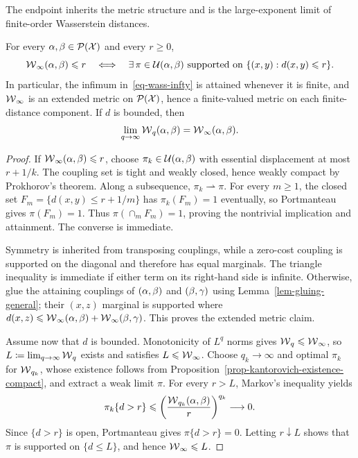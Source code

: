 The endpoint inherits the metric structure and is the large-exponent limit of finite-order Wasserstein distances.
\begin{prop}\label{prop-wasserstein-infinity-metric}
	For every $\alpha,\beta\in\mathcal{P}(\mathcal{X})$ and every $r\geq0$,
	\[
		\operatorname{\mathcal{W}}_\infty(\alpha,\beta)\leqslant r
		\quad\Longleftrightarrow\quad
		\exists\,\pi\in\mathcal{U}(\alpha,\beta)
		\text{ supported on }\{(x,y):d(x,y)\leqslant r\}.
	\]
	In particular, the infimum in~\eqref{eq-wass-infty} is attained whenever it is finite, and $\operatorname{\mathcal{W}}_\infty$ is an extended metric on $\mathcal{P}(\mathcal{X})$, hence a finite-valued metric on each finite-distance component. If $d$ is bounded, then
	\[
		\lim_{q\to\infty}\operatorname{\mathcal{W}}_q(\alpha,\beta)=\operatorname{\mathcal{W}}_\infty(\alpha,\beta).
	\]
\end{prop}
\begin{proof}
	If $\operatorname{\mathcal{W}}_\infty(\alpha,\beta)\leqslant r$, choose $\pi_k\in\mathcal{U}(\alpha,\beta)$ with essential displacement at most $r+1/k$. The coupling set is tight and weakly closed, hence weakly compact by Prokhorov's theorem. Along a subsequence, $\pi_k\rightharpoonup\pi$. For every $m\geq1$, the closed set $F_m=\{d(x,y)\leq r+1/m\}$ has $\pi_k(F_m)=1$ eventually, so Portmanteau gives $\pi(F_m)=1$. Thus $\pi(\cap_mF_m)=1$, proving the nontrivial implication and attainment. The converse is immediate.

	Symmetry is inherited from transposing couplings, while a zero-cost coupling is supported on the diagonal and therefore has equal marginals. The triangle inequality is immediate if either term on its right-hand side is infinite. Otherwise, glue the attaining couplings of $(\alpha,\beta)$ and $(\beta,\gamma)$ using Lemma~\ref{lem-gluing-general}; their $(x,z)$ marginal is supported where $d(x,z)\leqslant\operatorname{\mathcal{W}}_\infty(\alpha,\beta)+\operatorname{\mathcal{W}}_\infty(\beta,\gamma)$. This proves the extended metric claim.

	Assume now that $d$ is bounded. Monotonicity of $L^q$ norms gives $\operatorname{\mathcal{W}}_q\leqslant\operatorname{\mathcal{W}}_\infty$, so $L\coloneqq\lim_{q\to\infty}\operatorname{\mathcal{W}}_q$ exists and satisfies $L\leqslant\operatorname{\mathcal{W}}_\infty$. Choose $q_k\to\infty$ and optimal $\pi_k$ for $\operatorname{\mathcal{W}}_{q_k}$, whose existence follows from Proposition~\ref{prop-kantorovich-existence-compact}, and extract a weak limit $\pi$. For every $r>L$, Markov's inequality yields
	\[
		\pi_k\{d>r\}
		\leqslant
		\left(\frac{\operatorname{\mathcal{W}}_{q_k}(\alpha,\beta)}{r}\right)^{q_k}
		\longrightarrow0.
	\]
	Since $\{d>r\}$ is open, Portmanteau gives $\pi\{d>r\}=0$. Letting $r\downarrow L$ shows that $\pi$ is supported on $\{d\leq L\}$, and hence $\operatorname{\mathcal{W}}_\infty\leqslant L$.
\end{proof}

